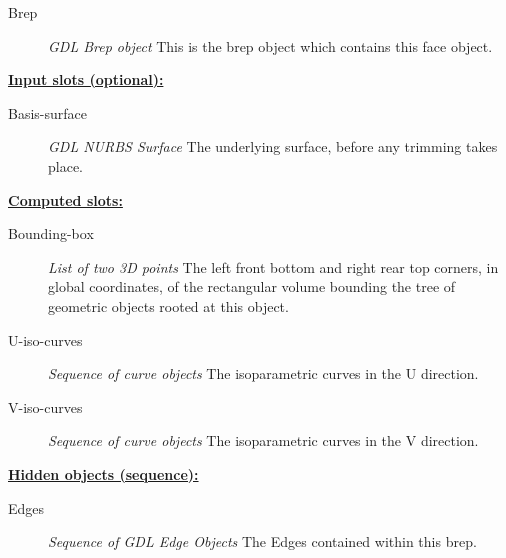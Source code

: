 \documentclass [11pt]{book}
\begin{document}
\begin{itemize}
\begin{description}
\item [Brep]
\emph{GDL Brep object} This is the brep object which contains this face object.


\end{description}






\textbf{
\underline{Input slots (optional):}}

\begin{description}

\item [Basis-surface]
\emph{GDL NURBS Surface} The underlying surface, before any trimming takes place.


\end{description}






\textbf{
\underline{Computed slots:}}

\begin{description}

\item [Bounding-box]
\emph{List of two 3D points} The left front bottom and right rear top corners, in global coordinates,
of the rectangular volume bounding the tree of geometric objects rooted at this object.


\item [U-iso-curves]
\emph{Sequence of curve objects} The isoparametric curves in the U direction.


\item [V-iso-curves]
\emph{Sequence of curve objects} The isoparametric curves in the V direction.


\end{description}






\textbf{
\underline{Hidden objects (sequence):}}

\begin{description}

\item [Edges]
\emph{Sequence of GDL Edge Objects} The Edges contained within this brep.


\end{description}







\end{itemize}
\end{document}
